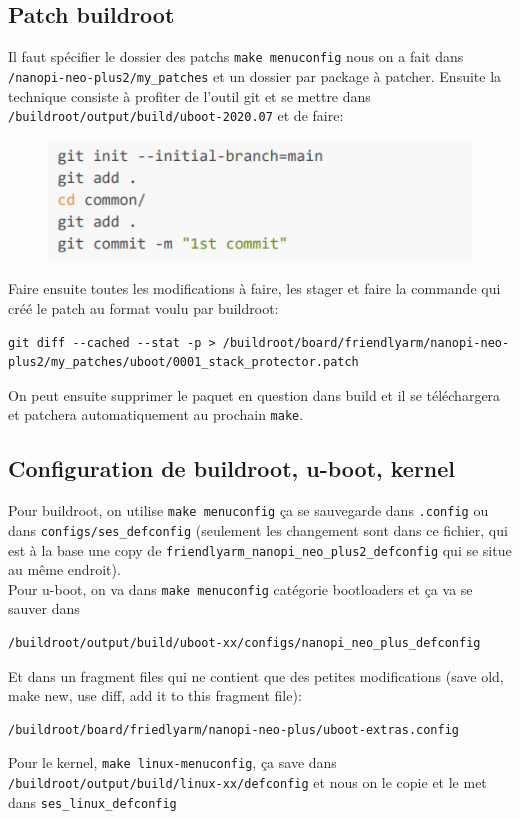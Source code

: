 \subsection{Patch buildroot}
Il faut spécifier le dossier des patchs \verb!make menuconfig! nous on a fait dans \verb!/nanopi-neo-plus2/my_patches! et un dossier par package à patcher. Ensuite la technique consiste à profiter de l'outil git et se mettre dans \verb!/buildroot/output/build/uboot-2020.07! et de faire:
\begin{figure}[H]
\centering
\includegraphics[width=0.9\columnwidth]{Figures/buildroot_03.png}
\end{figure}
Faire ensuite toutes les modifications à faire, les stager et faire la commande qui créé le patch au format voulu par buildroot:
\begin{Verbatim}[breaklines=true, breakanywhere=true]
git diff --cached --stat -p > /buildroot/board/friendlyarm/nanopi-neo-plus2/my_patches/uboot/0001_stack_protector.patch
\end{Verbatim}
On peut ensuite supprimer le paquet en question dans build et il se téléchargera et patchera automatiquement au prochain \verb!make!.
\subsection{Configuration de buildroot, u-boot, kernel}
Pour buildroot, on utilise \verb!make menuconfig! ça se sauvegarde dans \verb!.config! ou dans \verb!configs/ses_defconfig! (seulement les changement sont dans ce fichier, qui est à la base une copy de \verb!friendlyarm_nanopi_neo_plus2_defconfig! qui se situe au même endroit).\\
Pour u-boot, on va dans \verb!make menuconfig! catégorie bootloaders et ça va se sauver dans 
\begin{Verbatim}[breaklines=true, breakanywhere=true]
/buildroot/output/build/uboot-xx/configs/nanopi_neo_plus_defconfig
\end{Verbatim}
Et dans un fragment files qui ne contient que des petites modifications (save old, make new, use diff, add it to this fragment file): 
\begin{Verbatim}[breaklines=true, breakanywhere=true]
/buildroot/board/friedlyarm/nanopi-neo-plus/uboot-extras.config
\end{Verbatim}
Pour le kernel, \verb!make linux-menuconfig!, ça save dans \verb!/buildroot/output/build/linux-xx/defconfig! et nous on le copie et le met dans \verb!ses_linux_defconfig!
